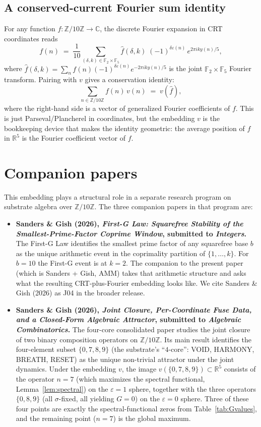 \documentclass[11pt,reqno]{amsart}
\theoremstyle{definition}
\newcommand{\Z}{\mathbb{Z}}
\newcommand{\R}{\mathbb{R}}
\newcommand{\C}{\mathbb{C}}
\newcommand{\F}{\mathbb{F}}
\begin{document}
\subsection{A conserved-current Fourier sum identity}

For any function $f : \Z/10\Z \to \C$, the discrete Fourier
expansion in CRT coordinates reads
\[
  f(n) \;=\; \frac{1}{10} \sum_{(\delta, k) \in \F_2 \times \F_5}
  \widehat{f}(\delta, k)\;
  (-1)^{\delta \varepsilon(n)} \, e^{2\pi i k y(n) / 5},
\]
where $\widehat{f}(\delta, k) = \sum_n f(n) (-1)^{\delta
\varepsilon(n)} e^{-2\pi i k y(n) / 5}$ is the joint
$\F_2 \times \F_5$ Fourier transform. Pairing with $v$ gives a
conservation identity:
\[
  \sum_{n \in \Z/10\Z} f(n) \, v(n) \;=\; v(\widehat{f}),
\]
where the right-hand side is a vector of generalized Fourier
coefficients of $f$. This is just Parseval/Plancherel in
coordinates, but the embedding $v$ is the bookkeeping device that
makes the identity geometric: the average position of $f$ in
$\R^5$ is the Fourier coefficient vector of $f$.

\section{Companion papers}
\label{sec:companions}

This embedding plays a structural role in a separate research
program on substrate algebra over $\Z/10\Z$. The three
companion papers in that program are:

\begin{itemize}[leftmargin=*]
\item \textbf{Sanders \& Gish (2026), \emph{First-G Law: Squarefree
  Stability of the Smallest-Prime-Factor Coprime Window},
  submitted to \emph{Integers}.} The First-G Law identifies the
  smallest prime factor of any squarefree base $b$ as the unique
  arithmetic event in the coprimality partition of
  $\{1, \ldots, k\}$. For $b = 10$ the First-G event is at
  $k = 2$. The companion to the present paper (which is
  Sanders + Gish, AMM) takes that arithmetic structure and asks
  what the resulting CRT-plus-Fourier embedding looks like. We
  cite Sanders \& Gish (2026) as J04 in the broader release.
\item \textbf{Sanders \& Gish (2026), \emph{Joint Closure,
  Per-Coordinate Fuse Data, and a Closed-Form Algebraic Attractor},
  submitted to \emph{Algebraic Combinatorics}.} The four-core
  consolidated paper studies the joint closure of two binary
  composition operators on $\Z/10\Z$. Its main result identifies
  the four-element subset $\{0, 7, 8, 9\}$ (the substrate's
  ``$4$-core'': VOID, HARMONY, BREATH, RESET) as the unique
  non-trivial attractor under the joint dynamics. Under the
  embedding $v$, the image $v(\{0, 7, 8, 9\}) \subset \R^{5}$
  consists of the operator $n = 7$ (which maximizes the spectral
  functional, Lemma~\ref{lem:spectral}) on the
  $\varepsilon = 1$ sphere, together with the three operators
  $\{0, 8, 9\}$ (all $\sigma$-fixed, all yielding $G = 0$) on the
  $\varepsilon = 0$ sphere. Three of these four points are exactly
  the spectral-functional zeros from
  Table~\ref{tab:Gvalues}, and the remaining point ($n = 7$) is
  the global maximum.
\end{itemize}
\end{document}

